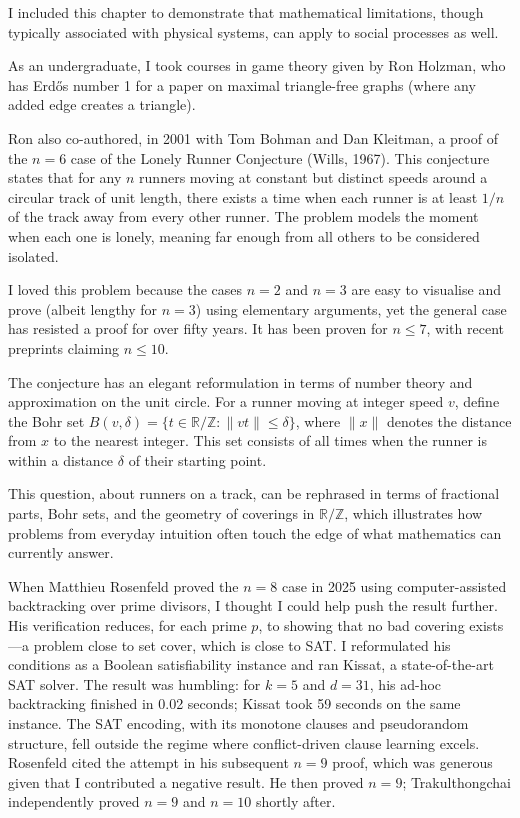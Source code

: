 \begin{commentary}
I included this chapter to demonstrate that mathematical limitations, though typically associated with physical systems, can apply to social processes as well.

As an undergraduate, I took courses in game theory given by Ron Holzman, who has Erdős number 1 for a paper on maximal triangle-free graphs (where any added edge creates a triangle).

Ron also co-authored, in 2001 with Tom Bohman and Dan Kleitman, a proof of the $n = 6$ case of the Lonely Runner Conjecture (Wills, 1967). This conjecture states that for any $n$ runners moving at constant but distinct speeds around a circular track of unit length, there exists a time when each runner is at least $1/n$ of the track away from every other runner. The problem models the moment when each one is \QSOpen{}lonely,\QSClose{} meaning far enough from all others to be considered isolated.

I loved this problem because the cases $n = 2$ and $n = 3$ are easy to visualise and prove (albeit lengthy for $n = 3$) using elementary arguments, yet the general case has resisted a proof for over fifty years. It has been proven for $n \leq 7$, with recent preprints claiming $n \leq 10$.

The conjecture has an elegant reformulation in terms of number theory and approximation on the unit circle. For a runner moving at integer speed $v$, define the Bohr set $B(v,\delta) = \{ t \in \mathbb{R}/\mathbb{Z} : \|vt\| \leq \delta \}$, where $\|x\|$ denotes the distance from $x$ to the nearest integer. This set consists of all times when the runner is within a distance $\delta$ of their starting point.

This question, about runners on a track, can be rephrased in terms of fractional parts, Bohr sets, and the geometry of coverings in $\mathbb{R}/\mathbb{Z}$, which illustrates how problems from everyday intuition often touch the edge of what mathematics can currently answer.

When Matthieu Rosenfeld proved the $n = 8$ case in 2025 using computer-assisted backtracking over prime divisors, I thought I could help push the result further. His verification reduces, for each prime $p$, to showing that no \QSOpen{}bad\QSClose{} covering exists—a problem close to set cover, which is close to SAT. I reformulated his conditions as a Boolean satisfiability instance and ran Kissat, a state-of-the-art SAT solver. The result was humbling: for $k = 5$ and $d = 31$, his ad-hoc backtracking finished in 0.02 seconds; Kissat took 59 seconds on the same instance. The SAT encoding, with its monotone clauses and pseudorandom structure, fell outside the regime where conflict-driven clause learning excels. Rosenfeld cited the attempt in his subsequent $n = 9$ proof, which was generous given that I contributed a negative result. He then proved $n = 9$; Trakulthongchai independently proved $n = 9$ and $n = 10$ shortly after.
\end{commentary}


